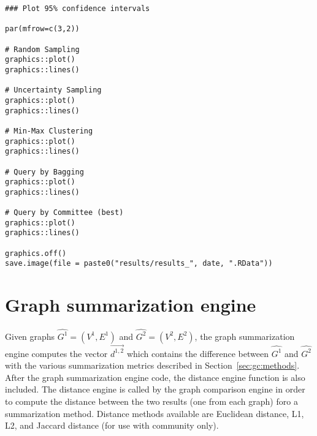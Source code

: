 {\begin{lstlisting}
### Plot 95% confidence intervals

par(mfrow=c(3,2))

# Random Sampling
graphics::plot()
graphics::lines()

# Uncertainty Sampling
graphics::plot()
graphics::lines()

# Min-Max Clustering
graphics::plot()
graphics::lines()

# Query by Bagging
graphics::plot()
graphics::lines()

# Query by Committee (best)
graphics::plot()
graphics::lines()

graphics.off()
save.image(file = paste0("results/results_", date, ".RData"))
\end{lstlisting}
}
















\section{Graph summarization engine}
\label{sec:appendicies:gc:engine}

Given graphs $\hat{G^1}=(V^1,E^1)$ and $\hat{G^2}=(V^2,E^2)$, the graph 
summarization engine computes the vector $\overrightarrow{d^{1,2}}$ which 
contains the difference between $\hat{G^1}$ and $\hat{G^2}$ with the various 
summarization metrics described in Section~\ref{sec:gc:methods}. After the 
graph summarization engine code, the distance engine function is also included. 
The distance engine is called by the graph comparison engine in order to 
compute the distance between the two results (one from each graph) foro a 
summarization method. Distance methods available are Euclidean distance, L1, 
L2, and Jaccard distance (for use with community only).

